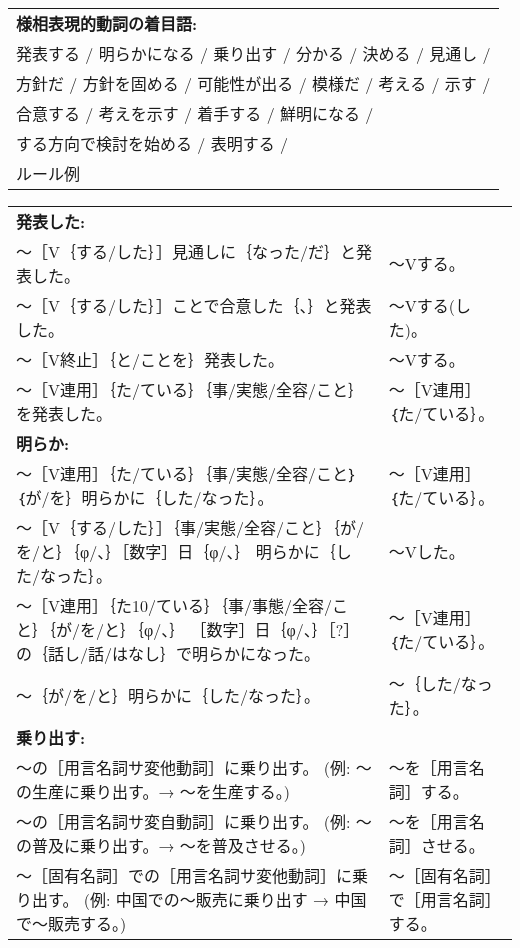 \begin{table}[hb]
\begin{center}
\begin{tabular}{p{119mm}}
\hline
{\bf 様相表現的動詞の着目語:}\\
発表する / 明らかになる / 乗り出す / 分かる / 決める / 見通し / \\
方針だ / 方針を固める / 可能性が出る / 模様だ / 考える / 示す / \\
合意する / 考えを示す / 着手する / 鮮明になる / \\
する方向で検討を始める / 表明する / \\
\hline
ルール例
\end{tabular}

\begin{tabular}[hb]{p{75mm}|p{40mm}}
\hline 
{\bf 発表した:} & \\
〜［V｛する/した｝］見通しに｛なった/だ｝と発表した。& 〜Vする。\\
〜［V｛する/した｝］ことで合意した｛、｝と発表した。 & 〜Vする(した)。\\
〜［V終止］｛と/ことを｝発表した。 & 〜Vする。\\
〜［V連用］｛た/ている｝｛事/実態/全容/こと｝を発表した。
 & 〜［V連用］｛た/ている｝。\\
\hline 
{\bf 明らか:} & \\
〜［V連用］｛た/ている｝｛事/実態/全容/こと｝｛が/を｝明らかに｛した/なった｝。
 & 〜［V連用］｛た/ている｝。\\
〜［V｛する/した｝］｛事/実態/全容/こと｝｛が/を/と｝｛φ/、｝［数字］日｛φ/、｝
 明らかに｛した/なった｝。 
 & 〜Vした。\\
〜［V連用］｛た10/ている｝｛事/事態/全容/こと｝｛が/を/と｝｛φ/、｝
［数字］日｛φ/、｝［?］の｛話し/話/はなし｝で明らかになった。
 & 〜［V連用］｛た/ている｝。\\
〜｛が/を/と｝明らかに｛した/なった｝。 &  〜｛した/なった｝。\\
\hline
{\bf 乗り出す:} & \\
〜の［用言名詞サ変他動詞］に乗り出す。
 (例: 〜の生産に乗り出す。→ 〜を生産する。)
 & 〜を［用言名詞］する。\\
〜の［用言名詞サ変自動詞］に乗り出す。
 (例: 〜の普及に乗り出す。→ 〜を普及させる。)
 & 〜を［用言名詞］させる。\\
〜［固有名詞］での［用言名詞サ変他動詞］に乗り出す。
 (例: 中国での〜販売に乗り出す → 中国で〜販売する。)
 & 〜［固有名詞］で［用言名詞］する。\\
\hline
\end{tabular}
\end{center}
\end{table}

